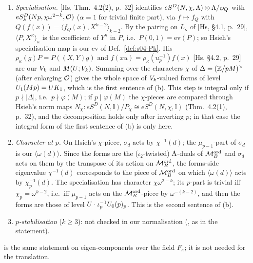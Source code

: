 \begin{remark}
\begin{enumerate}[label=(\roman*)]
  $\Hom_\Lam(\Mord,\Lam)$ it becomes $Q\circ\iota_2:[z]\mapsto z^2z^{-k}=z^{-(k-2)}$, whose kernel is $P^{\rm ad}_k$. Since $\Mord$ is
  $\Lam$-free (Thm.~\ref{thm:s04-control}(a)),
  $eS^D(N,\Lam)\otimes_{\Lam,Q}\cO\cong\Hom_\Lam(\Mord,\Lam)\otimes_\Lam\Lam/P^{\rm ad}_k=\Hom_\cO(\Mord\otimes_\Lam\Lam/P^{\rm ad}_k,\cO)$.
  \emph{Warning:} $\Mord\otimes_\Lam\Lam/P^{\rm ad}_k$ is thus $\Hom_\cO(e\,\Brandt{U\Kp1}{\Vk\otimes\cO},\cO)$; it is not the stage-03
  homological module $\Zp[X]\otimes\Vk$ ($S_\ell=\ell^{2-k}$ there, $\ell^{k-2}$ on the trivial-nebentypus piece here); the two differ by
  $\Vk$ versus $\Vk^\vee$.
\item \emph{Specialisation.} [Hs, Thm.~4.2(2), p.~32] identifies $eS^D(N,\chi,\Lambda)\otimes\Lambda/\wp_Q$ with
  $eS^D_k(Np,\chi\omega^{2-k},\mathcal{O})$ ($\alpha=1$ for trivial finite part), via $f\mapsto f_Q$ with $Q(f(x))=\langle f_Q(x),X^{k-2}\rangle_{k-2}$.
  By the pairing on $L_\kappa$ of [Hs, \S4.1, p.~29], $\langle P,X^\kappa\rangle_\kappa$ is the coefficient of $Y^\kappa$ in $P$, i.e.\
  $P(0,1)=\mathrm{ev}(P)$; so Hsieh's specialisation map is our $\mathrm{ev}$ of Def.~\ref{def:s04-Pk}. His $\rho_\kappa(g)P=P((X,Y)g)$ and
  $f(xu)=\rho_\kappa(u_p^{-1})f(x)$ [Hs, \S4.2, p.~29] are our $\Vk$ and $M(U;V_k)$. Summing over the characters $\chi$ of
  $\Delta=(\mathbb{Z}/pM)^\times$ (after enlarging $\mathcal{O}$) gives the whole space of $\Vk$-valued forms of level $U_1(Mp)=UK_{1}$, which is the
  first sentence of (b). This step is integral only if $p\nmid|\Delta|$, i.e.\ $p\nmid\varphi(M)$; if $p\mid\varphi(M)$ the $\chi$-pieces
  are compared through Hsieh's norm maps $N_\chi:eS^D(N,\mathbb I)/P_\chi\cong eS^D(N,\chi,\mathbb I)$ (Thm.~4.2(1), p.~32), and the
  decomposition holds only after inverting $p$; in that case the integral form of the first sentence of (b) is only \stsketch{} here.
\item \emph{Character at $p$.} On Hsieh's $\chi$-piece, $\sigma_d$ acts by $\chi^{-1}(d)$; the $\mu_{p-1}$-part of $\sigma_d$ is our
  $\langle\omega(d)\rangle$. Since the forms are the ($\iota_2$-twisted) $\Lam$-duals of $\Mord$ and $\sigma_d$ acts on them by the
  transpose of its action on $\Mord$, the forms-side eigenvalue $\chi^{-1}(d)$ corresponds to the piece of $\Mord$ on which
  $\langle\omega(d)\rangle$ acts by $\chi_p^{-1}(d)$. The specialisation has character $\chi\omega^{2-k}$; its $p$-part is trivial iff $\chi_p=\omega^{k-2}$, i.e.\ iff
  $\mu_{p-1}$ acts on the $\Mord$-piece by $\omega^{-(k-2)}$, and then the forms are those of level $U\cdot\iota_p^{-1}U_0(p)_p$. This is
  the second sentence of (b).
\item \emph{$p$-stabilisation} ($k\ge3$): not checked in our normalisation (\stexp, as in the statement).
\end{enumerate}
 is the same statement on
eigen-components over the field $F_\kappa$; it is not needed for the translation.
\end{remark}

